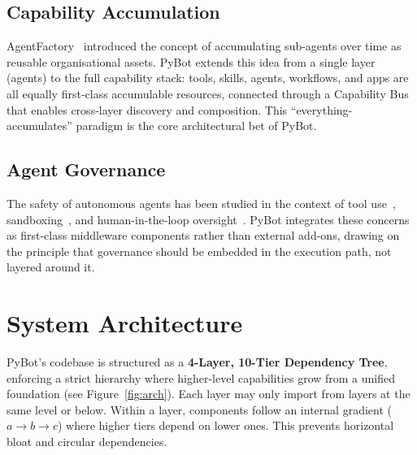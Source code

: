 \documentclass[11pt,a4paper]{article}
\begin{document}
\subsection{Capability Accumulation}

AgentFactory~\cite{agentfactory2024} introduced the concept of accumulating sub-agents over time as reusable organisational assets.
PyBot extends this idea from a single layer (agents) to the full capability stack: tools, skills, agents, workflows, and apps are all equally first-class accumulable resources, connected through a Capability Bus that enables cross-layer discovery and composition.
This ``everything-accumulates'' paradigm is the core architectural bet of PyBot.

\subsection{Agent Governance}

The safety of autonomous agents has been studied in the context of tool use~\cite{toolformer2023}, sandboxing~\cite{e2b2024}, and human-in-the-loop oversight~\cite{hitl2023}.
PyBot integrates these concerns as first-class middleware components rather than external add-ons, drawing on the principle that governance should be embedded in the execution path, not layered around it.


\section{System Architecture}
\label{sec:arch}

PyBot's codebase is structured as a \textbf{4-Layer, 10-Tier Dependency Tree}, enforcing a strict hierarchy where higher-level capabilities grow from a unified foundation (see Figure~\ref{fig:arch}). Each layer may only import from layers at the same level or below. Within a layer, components follow an internal gradient ($a \rightarrow b \rightarrow c$) where higher tiers depend on lower ones. This prevents horizontal bloat and circular dependencies.
\end{document}
